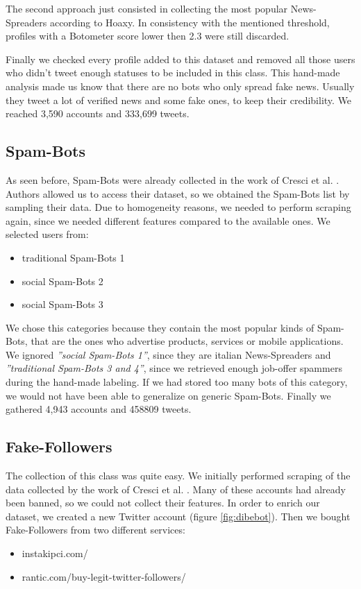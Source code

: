 The second approach just consisted in collecting the most popular News-Spreaders according to Hoaxy. In consistency with the mentioned threshold, profiles with a Botometer score lower then 2.3 were still discarded.

Finally we checked every profile added to this dataset and removed all those users who didn't tweet enough statuses to be included in this class. This hand-made analysis made us know that there are no bots who only spread fake news. Usually they tweet a lot of verified news and some fake ones, to keep their credibility.
We reached 3,590 accounts and 333,699 tweets.

\subsection{Spam-Bots}
As seen before, Spam-Bots were already collected in the work of Cresci et al. \cite{Cresci}. Authors allowed us to access their dataset, so we obtained the Spam-Bots list by sampling their data. Due to homogeneity reasons, we needed to perform scraping again, since we needed different features compared to the available ones.
We selected users from:
\begin{itemize}
	\item[\PencilRight]traditional Spam-Bots 1
	\item[\PencilRight]social Spam-Bots 2
	\item[\PencilRight]social Spam-Bots 3
\end{itemize}

We chose this categories because they contain the most popular kinds of Spam-Bots, that are the ones who advertise products, services or mobile applications. We ignored \emph{''social Spam-Bots 1''}, since they are italian News-Spreaders and \emph{''traditional Spam-Bots 3 and 4''}, since we retrieved enough job-offer spammers during the hand-made labeling. If we had stored too many bots of this category, we would not have been able to generalize on generic Spam-Bots. Finally we gathered 4,943 accounts and 458809 tweets.

\subsection{Fake-Followers}
The collection of this class was quite easy. We initially performed scraping of the data collected by the work of Cresci et al. \cite{Cresci}. Many of these accounts had already been banned, so we could not collect their features. In order to enrich our dataset, we created a new Twitter account (figure \ref{fig:dibebot}). Then we bought Fake-Followers from two different services:
\begin{itemize}
	\item[\PencilRight] instakipci.com/
	\item[\PencilRight] rantic.com/buy-legit-twitter-followers/
\end{itemize}

